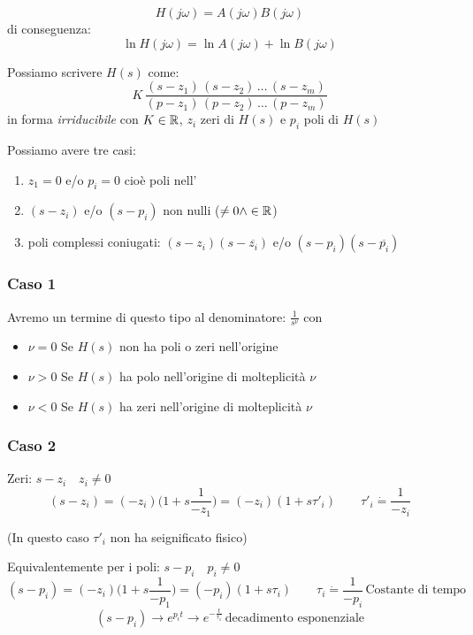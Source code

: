\[ 
	H(j \omega)=A(j \omega)B(j \omega)
 \]
 di conseguenza: 
 \[ 
	\ln H(j \omega)=\ln A(j \omega) + \ln B(j \omega)
 \]
 
 
 
 Possiamo scrivere $ H(s) $ come:
 \[  
 	K \, \frac{(s-z_1)\,(s-z_2)\,\dots \,(s-z_m)}{(p-z_1)\,(p-z_2)\,\dots \,(p-z_m)}
 \]
 in forma \emph{irriducibile} con $K \in \mathbb{R}  $, $ z_i $ zeri di $ H(s) $ e $ p_i $ poli di $ H(s) $
 
 Possiamo avere tre casi:
 \begin{enumerate}
 	\item $ z_1=0 $ e/o $ p_i = 0 $ cioè poli nell' 
 	\item $ (s-z_i) $ e/o $ (s-p_i) $ non nulli ($ \ne 0  \wedge \in \mathbb{R}$)
 	\item poli complessi coniugati: $ (s-z_i)(s-\overline{z_i}) $ e/o  $ (s-p_i)(s-\overline{p_i}) $
 \end{enumerate}

\subsubsection{Caso 1}
Avremo un termine di questo tipo al denominatore:
 $ \frac{1}{s^\nu}  $
con 
\begin{itemize}
	\item $ \nu =0 $ Se $ H(s) $ non ha poli o zeri nell'origine
	\item $ \nu >0 $ Se $ H(s) $ ha polo nell'origine di molteplicità $ \nu $
	\item $ \nu <0 $ Se $ H(s) $ ha zeri nell'origine di molteplicità $\nu$
\end{itemize}

\subsubsection{Caso 2}
Zeri: $ s-z_i \quad z_i \ne 0 $
\[ 
	(s-z_i)=(-z_i)\Big(1+s \frac{1}{-z_1} \Big)=(-z_i)(1+s \tau'_i) \qquad \tau'_i \dot{=} \frac{1}{-z_i}
 \]
 
 (In questo caso $ \tau'_i $ non ha seignificato fisico) %
 
 Equivalentemente per i poli: $ s-p_i \quad p_i \ne 0 $
 \[ 
 (s-p_i)=(-z_i)\Big(1+s \frac{1}{-p_1} \Big)=(-p_i)(1+s \tau_i) \qquad \tau_i \dot{=} \frac{1}{-p_i} \, \text{Costante di tempo}
 \]
 \[ (s-p_i) \rightarrow e^{p_i t} \rightarrow e^{-\frac{t}{\tau_1}} \, \text{decadimento esponenziale}\]
 
